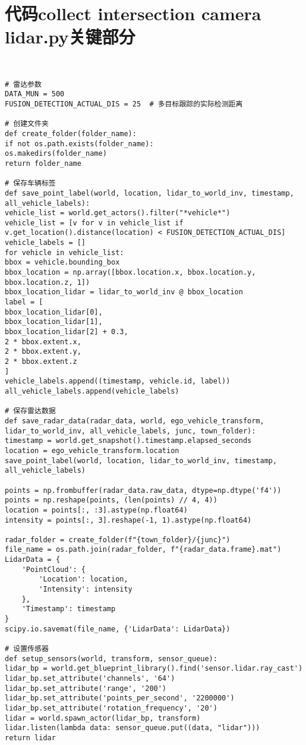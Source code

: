 \section{代码collect intersection camera lidar.py关键部分}

\begin{lstlisting}


# 雷达参数
DATA_MUN = 500
FUSION_DETECTION_ACTUAL_DIS = 25  # 多目标跟踪的实际检测距离

# 创建文件夹
def create_folder(folder_name):
if not os.path.exists(folder_name):
os.makedirs(folder_name)
return folder_name

# 保存车辆标签
def save_point_label(world, location, lidar_to_world_inv, timestamp, all_vehicle_labels):
vehicle_list = world.get_actors().filter("*vehicle*")
vehicle_list = [v for v in vehicle_list if v.get_location().distance(location) < FUSION_DETECTION_ACTUAL_DIS]
vehicle_labels = []
for vehicle in vehicle_list:
bbox = vehicle.bounding_box
bbox_location = np.array([bbox.location.x, bbox.location.y, bbox.location.z, 1])
bbox_location_lidar = lidar_to_world_inv @ bbox_location
label = [
bbox_location_lidar[0],
bbox_location_lidar[1],
bbox_location_lidar[2] + 0.3,
2 * bbox.extent.x,
2 * bbox.extent.y,
2 * bbox.extent.z
]
vehicle_labels.append((timestamp, vehicle.id, label))
all_vehicle_labels.append(vehicle_labels)

# 保存雷达数据
def save_radar_data(radar_data, world, ego_vehicle_transform, lidar_to_world_inv, all_vehicle_labels, junc, town_folder):
timestamp = world.get_snapshot().timestamp.elapsed_seconds
location = ego_vehicle_transform.location
save_point_label(world, location, lidar_to_world_inv, timestamp, all_vehicle_labels)

points = np.frombuffer(radar_data.raw_data, dtype=np.dtype('f4'))
points = np.reshape(points, (len(points) // 4, 4))
location = points[:, :3].astype(np.float64)
intensity = points[:, 3].reshape(-1, 1).astype(np.float64)

radar_folder = create_folder(f"{town_folder}/{junc}")
file_name = os.path.join(radar_folder, f"{radar_data.frame}.mat")
LidarData = {
	'PointCloud': {
		'Location': location,
		'Intensity': intensity
	},
	'Timestamp': timestamp
}
scipy.io.savemat(file_name, {'LidarData': LidarData})

# 设置传感器
def setup_sensors(world, transform, sensor_queue):
lidar_bp = world.get_blueprint_library().find('sensor.lidar.ray_cast')
lidar_bp.set_attribute('channels', '64')
lidar_bp.set_attribute('range', '200')
lidar_bp.set_attribute('points_per_second', '2200000')
lidar_bp.set_attribute('rotation_frequency', '20')
lidar = world.spawn_actor(lidar_bp, transform)
lidar.listen(lambda data: sensor_queue.put((data, "lidar")))
return lidar


\end{lstlisting}
